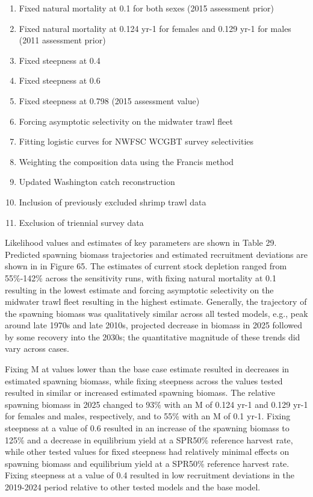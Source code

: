 \documentclass[
]{scrartcl}
\providecommand{\tightlist}{%
  \setlength{\itemsep}{0pt}\setlength{\parskip}{0pt}}\usepackage{longtable,booktabs,array}
\begin{document}
\begin{enumerate}
\def\labelenumi{\arabic{enumi}.}
\tightlist
\item
  Fixed natural mortality at 0.1 for both sexes (2015 assessment prior)
\item
  Fixed natural mortality at 0.124 yr-1 for females and 0.129 yr-1 for
  males (2011 assessment prior)
\item
  Fixed steepness at 0.4
\item
  Fixed steepness at 0.6
\item
  Fixed steepness at 0.798 (2015 assessment value)
\item
  Forcing asymptotic selectivity on the midwater trawl fleet
\item
  Fitting logistic curves for NWFSC WCGBT survey selectivities
\item
  Weighting the composition data using the Francis method
\item
  Updated Washington catch reconstruction
\item
  Inclusion of previously excluded shrimp trawl data
\item
  Exclusion of triennial survey data
\end{enumerate}

Likelihood values and estimates of key parameters are shown in Table 29.
Predicted spawning biomass trajectories and estimated recruitment
deviations are shown in in Figure 65. The estimates of current stock
depletion ranged from 55\%-142\% across the sensitivity runs, with
fixing natural mortality at 0.1 resulting in the lowest estimate and
forcing asymptotic selectivity on the midwater trawl fleet resulting in
the highest estimate. Generally, the trajectory of the spawning biomass
was qualitatively similar across all tested models, e.g., peak around
late 1970s and late 2010s, projected decrease in biomass in 2025
followed by some recovery into the 2030s; the quantitative magnitude of
these trends did vary across cases.

Fixing M at values lower than the base case estimate resulted in
decreases in estimated spawning biomass, while fixing steepness across
the values tested resulted in similar or increased estimated spawning
biomass. The relative spawning biomass in 2025 changed to 93\% with an M
of 0.124 yr-1 and 0.129 yr-1 for females and males, respectively, and to
55\% with an M of 0.1 yr-1. Fixing steepness at a value of 0.6 resulted
in an increase of the spawning biomass to 125\% and a decrease in
equilibrium yield at a SPR50\% reference harvest rate, while other
tested values for fixed steepness had relatively minimal effects on
spawning biomass and equilibrium yield at a SPR50\% reference harvest
rate. Fixing steepness at a value of 0.4 resulted in low recruitment
deviations in the 2019-2024 period relative to other tested models and
the base model.
\end{document}
